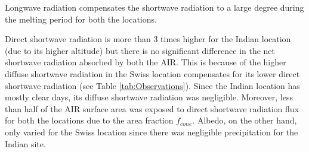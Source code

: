 \documentclass[utf8]{frontiersSCNS} %
\begin{document}
Longwave radiation compensates the shortwave radiation to a large degree during the melting period for both the
locations.

Direct shortwave radiation is more than 3 times higher for the Indian location (due to its higher altitude) but
there is no significant difference in the net shortwave radiation absorbed by both the AIR. This is because of the
higher diffuse shortwave radiation in the Swiss location compensates for its lower direct shortwave radiation (see
Table \ref{tab:Observations}).  Since the Indian location has mostly clear days, its diffuse shortwave radiation
was negligible. Moreover, less than half of the AIR surface area was exposed to direct shortwave radiation flux for
both the locations due to the area fraction $f_{cone}$.   Albedo, on the other hand, only varied for the Swiss
location since there was negligible precipitation for the Indian site.
\end{document}
